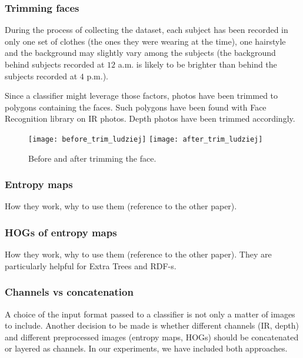         \subsubsection*{Trimming faces}
        During the process of collecting the dataset, each subject has been
        recorded in only one set of clothes (the ones they were wearing at the
        time), one hairstyle and the background may slightly vary among the
        subjects (the background behind subjects recorded at $12$ a.m. is
        likely to be brighter than behind the subjects recorded at $4$ p.m.).

        Since a classifier might leverage those factors, photos have been
        trimmed to polygons containing the faces. Such polygons have been
        found with Face Recognition library \cite{facerecog} on IR photos.
        Depth photos have been trimmed accordingly.

        \begin{figure}[H]
        \caption{Before and after trimming the face.}
        \centering
        \texttt{[image: before\_trim\_ludziej]}
        \texttt{[image: after\_trim\_ludziej]}
        \end{figure}

        \subsubsection*{Entropy maps}
        How they work, why to use them (reference to the other paper).

        \subsubsection*{HOGs of entropy maps}
        How they work, why to use them (reference to the other paper). They
        are particularly helpful for Extra Trees and RDF-s.

        \subsubsection*{Channels vs concatenation}
        A choice of the input format passed to a classifier is not only a matter
        of images to include. Another decision to be made is whether different
        channels (IR, depth) and different preprocessed images (entropy maps,
        HOGs) should be concatenated or layered as channels. In our experiments,
        we have included both approaches.

